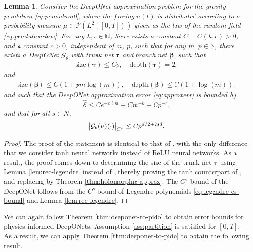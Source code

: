 \documentclass{article}
\numberwithin{equation}{section}
\newcommand{\size}{\mathrm{size}}
\newcommand{\depth}{\mathrm{depth}}
\newcommand{\Err}{\widehat{\mathscr{E}}}
\newcommand{\N}{\mathbb{N}}
\newcommand{\cG}{\mathcal{G}}
\newcommand{\cP}{\mathcal{P}}
\newcommand{\trunk}{{\bm{\tau}}}
\newcommand{\branch}{{\bm{\beta}}}
\newcommand{\1}{\mathbbm{1}}
\newtheorem{lemma}[theorem]{Lemma}
\begin{document}
\begin{lemma} \label{lem:pendulum}
Consider the DeepONet approximation problem for the gravity pendulum \eqref{eq:pendulum0}, where the forcing $u(t)$ is distributed according to a probability measure $\mu \in \cP(L^2([0,T]))$ given as the law of the random field \eqref{eq:pendulum-law}. For any $k,r\in \N$, there exists a constant $C = C(k,r)>0$, and a constant $c>0$, independent of $m$, $p$, such that for any $m, \, p \in \N$, there exists a DeepONet $\cG_\theta$ with trunk net $\trunk$ and branch net $\branch$, such that 
\begin{gather}
\size(\trunk) \le Cp,
\quad
\depth(\trunk) = 2,
\end{gather}
and
\begin{gather}
\size(\branch) \le C(1+pm \log(m)), 
\quad
\depth(\branch) \le C(1+ \log(m)),
\end{gather}
and such that the DeepONet approximation error \eqref{eq:approxerr} is bounded by 
\begin{equation}
\Err 
\le 
C e^{-c\ell m}
+
C m^{-k} 
+
C p^{-r},
\end{equation}
and that for all $s\in N$,
\begin{equation}
     \abs{\cG_\theta(u)(\cdot)}_{C^s} \leq C p^{d/2+2sd}. 
\end{equation}
\end{lemma}
\begin{proof}
The proof of the statement is identical to that of \cite[Theorem 4.10]{LMK1}, with the only difference that we consider tanh neural networks instead of ReLU neural networks. As a result, the proof comes down to determining the size of the trunk net $\trunk$ using Lemma \ref{lem:rec-legendre} instead of \cite[Proposition 2.10]{opschoor2019exponential}, thereby proving the tanh counterpart of \cite[Proposition 4.5]{LMK1}, and replacing \cite[Proposition 4.9]{LMK1} by Theorem \ref{thm:holomorphic-approx}. The $C^s$-bound of the DeepONet follows from the $C^s$-bound of Legendre polynomials \eqref{eq:legendre-cs-bound} and Lemma \ref{lem:rec-legendre}.
\end{proof}

We can again follow Theorem \ref{thm:deeponet-to-pido} to obtain error bounds for physics-informed DeepONets. Assumption \ref{ass:partition} is satisfied for $[0,T]$. As a result, we can apply Theorem \ref{thm:deeponet-to-pido} to obtain the following result. 
\end{document}
